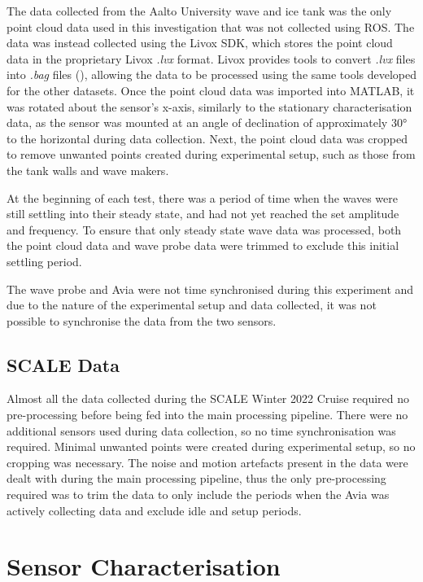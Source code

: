 The data collected from the Aalto University wave and ice tank was the only point cloud data used in this investigation that was not collected using \ac{ROS}. The data was instead collected using the Livox SDK, which stores the point cloud data in the proprietary Livox \emph{.lvx} format. Livox provides tools to convert \emph{.lvx} files into \emph{.bag} files (\cite{livoxLivoxSDKLivox_ros_driver2025}), allowing the data to be processed using the same tools developed for the other datasets. Once the point cloud data was imported into MATLAB, it was rotated about the sensor's x-axis, similarly to the stationary characterisation data, as the sensor was mounted at an angle of declination of approximately 30° to the horizontal during data collection. Next, the point cloud data was cropped to remove unwanted points created during experimental setup, such as those from the tank walls and wave makers.

At the beginning of each test, there was a period of time when the waves were still settling into their steady state, and had not yet reached the set amplitude and frequency. To ensure that only steady state wave data was processed, both the point cloud data and wave probe data were trimmed to exclude this initial settling period.

The wave probe and Avia were not time synchronised during this experiment and due to the nature of the experimental setup and data collected, it was not possible to synchronise the data from the two sensors.

\subsection{SCALE Data}
\label{subsec:ch5.section1.subsec4}

Almost all the data collected during the \ac{SCALE} Winter 2022 Cruise required no pre-processing before being fed into the main processing pipeline. There were no additional sensors used during data collection, so no time synchronisation was required. Minimal unwanted points were created during experimental setup, so no cropping was necessary. The noise and motion artefacts present in the data were dealt with during the main processing pipeline, thus the only pre-processing required was to trim the data to only include the periods when the Avia was actively collecting data and exclude idle and setup periods.

\section{Sensor Characterisation}
\label{sec:ch5.section2}


